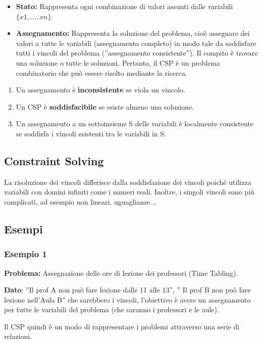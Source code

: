 \begin{itemize}
    \item \textbf{Stato:} Rappresenta ogni combinazione di valori assunti dalle variabili $\{x1,..., xn\}$.
    \item \textbf{Assegnamento:} Rappresenta la soluzione del problema, cioè assegnare dei valori a tutte le variabili (assegnamento completo) in modo tale da soddisfare tutti i vincoli del problema (”assegnamento consistente”). Il compito è trovare una soluzione o tutte le soluzioni. Pertanto, il CSP è un problema combinatorio che può essere risolto mediante la ricerca.
\end{itemize}
\begin{enumerate}
    \item Un assegnamento è \textbf{inconsistente} se viola un vincolo.
    \item Un CSP è \textbf{soddisfacibile} se esiste almeno una soluzione.
    \item Un assegnamento a un sottoinsieme S delle variabili è localmente consistente se soddisfa i vincoli esistenti tra le variabili in S.
\end{enumerate}

\subsection{Constraint Solving}
La risoluzione dei vincoli differisce dalla soddisfazione dei vincoli poiché utilizza variabili con domini infiniti come i numeri reali. Inoltre, i singoli vincoli sono più complicati, ad esempio non lineari, uguaglianze...
\subsection{Esempi}
\subsubsection{Esempio 1}
\textbf{Problema:} Assegnazione delle ore di lezione dei professori (Time Tabling).

\vspace{0.2cm}

\noindent \textbf{Dato}: ”Il prof A non può fare lezione dalle 11 alle 13”, ” Il prof B non può fare lezione nell’Aula B” che sarebbero i vincoli, l’obiettivo è avere un assegnamento per tutte le variabili del problema (che saranno i professori e le aule).
\vspace{0.2cm}

\noindent Il CSP quindi è un modo di rappresentare i problemi attraverso una serie di relazioni.
\vspace{0.2cm}

